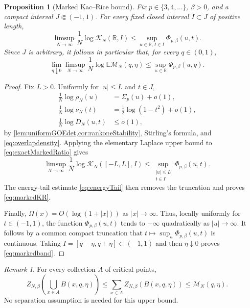 \documentclass[11pt,reqno]{amsart}
\numberwithin{equation}{section}
\theoremstyle{plain}
\newtheorem{proposition}[proposition]{Proposition}
\theoremstyle{definition}
\theoremstyle{remark}
\newtheorem{remark}[remark]{Remark}
\newcommand{\E}{\mathbb E}
\newcommand{\R}{\mathbb R}
\newcommand{\1}{\mathbf 1}
\newcommand{\MN}{\mathcal M_N}
\newcommand{\SigmaP}{\Sigma_p}
\newcommand{\PhiP}{\Phi_{p,\beta}}
\newcommand{\Om}{\Omega}
\begin{document}
\begin{proposition}[Marked Kac--Rice bound]\label{prop:markedKR}
Fix \(p\in\{3,4,\ldots\}\), \(\beta>0\), and a compact interval
\(J\Subset(-1,1)\).  For every fixed closed interval \(I\subset J\)
of positive length,
\begin{equation}\label{eq:markedKR}
 \limsup_{N\to\infty}\frac1N\log\mathcal K_N(\R,I)
 \leq\sup_{u\in\R,\,t\in I}\PhiP(u,t).
\end{equation}
Since \(J\) is arbitrary, it follows in particular that, for every
\(q\in(0,1)\),
\begin{equation}\label{eq:markedband}
 \lim_{\eta\downarrow0}\limsup_{N\to\infty}
 \frac1N\log\E\MN(q,\eta)
 \leq\sup_{u\in\R}\PhiP(u,q).
\end{equation}
\end{proposition}

\begin{proof}
Fix \(L>0\).  Uniformly for \(|u|\leq L\) and \(t\in J\),
\begin{align*}
 \frac1N\log\rho_N(u)&=\SigmaP(u)+o(1),\\
 \frac1N\log\nu_N(t)&=\frac12\log(1-t^2)+o(1),\\
 \frac1N\log D_N(u,t)&\leq o(1),
\end{align*}
by \cref{lem:uniformGOEdet,cor:rankoneStability}, Stirling's formula,
and \eqref{eq:overlapdensity}.  Applying the elementary Laplace upper
bound to \eqref{eq:exactMarkedRatio} gives
\[
 \limsup_{N\to\infty}\frac1N\log\mathcal K_N([-L,L],I)
 \leq\sup_{\substack{|u|\leq L\\t\in I}}\PhiP(u,t).
\]
The energy-tail estimate \eqref{eq:energyTail} then removes the
truncation and proves \eqref{eq:markedKR}.

Finally, \(\Om(x)=O(\log(1+|x|))\) as \(|x|\to\infty\).  Thus, locally
uniformly for \(t\in(-1,1)\), the function \(\PhiP(u,t)\) tends to
\(-\infty\) quadratically as \(|u|\to\infty\).  It follows by a common
compact truncation that \(t\mapsto\sup_u\PhiP(u,t)\) is continuous.
Taking \(I=[q-\eta,q+\eta]\subset(-1,1)\) and then
\(\eta\downarrow0\) proves \eqref{eq:markedband}.
\end{proof}

\begin{remark}\label{rem:unionbound}
For every collection \(A\) of critical points,
\begin{equation}\label{eq:unionbound}
 Z_{N,\beta}\left(\bigcup_{x\in A}B(x,q,\eta)\right)
 \leq \sum_{x\in A}Z_{N,\beta}(B(x,q,\eta))
 \leq\MN(q,\eta).
\end{equation}
No separation assumption is needed for this upper bound.
\end{remark}
\end{document}
